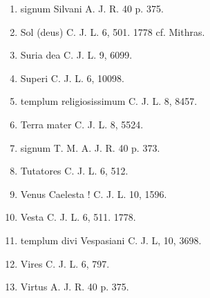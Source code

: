 \documentclass[a4paper, 11pt, oneside, polutonikogreek, german, twocolumn]{article}
\begin{document}
\begin{enumerate}
\item signum Silvani A. J. R. 40 p. 375.

\item Sol (deus) C. J. L. 6, 501. 1778 cf. Mithras.

\item Suria dea C. J. L. 9, 6099.

\item Superi C. J. L. 6, 10098.

\item templum religiosissimum C. J. L. 8, 8457.

\item Terra mater C. J. L. 8, 5524.

\item signum T. M. A. J. R. 40 p. 373.

\item Tutatores C. J. L. 6, 512.

\item Venus Caelesta ! C. J. L. 10, 1596.

\item Vesta C. J. L. 6, 511. 1778.

\item templum divi Vespasiani C. J. L, 10, 3698.

\item Vires C. J. L. 6, 797.

\item Virtus A. J. R. 40 p. 375.
\end{enumerate}
\end{document}
